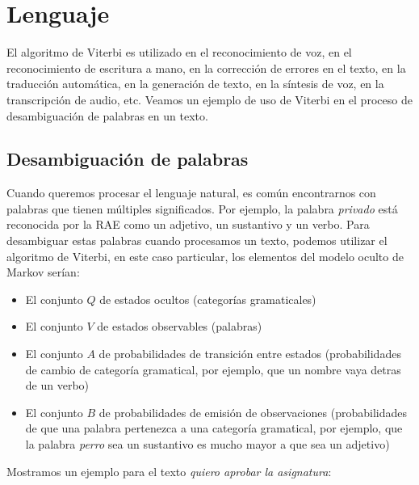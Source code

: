 \documentclass[11pt,openany]{book}
\begin{document}
\section{Lenguaje}
El algoritmo de Viterbi es utilizado en el reconocimiento de voz, en el reconocimiento
de escritura a mano, en la corrección de errores en el texto, en la traducción automática,
en la generación de texto, en la síntesis de voz, en la transcripción de audio, etc. Veamos
un ejemplo de uso de Viterbi en el proceso de desambiguación de palabras en un texto.
\subsection{Desambiguación de palabras}
Cuando queremos procesar el lenguaje natural, es común encontrarnos con palabras que tienen
múltiples significados. Por ejemplo, la palabra \textit{privado} está reconocida por la RAE como 
un adjetivo, un sustantivo y un verbo. Para desambiguar estas palabras cuando procesamos
un texto, podemos utilizar el algoritmo de Viterbi, en este caso particular, 
los elementos del modelo oculto de Markov serían:
\begin{itemize}
      \boldmath
      \item El conjunto $Q$ de estados ocultos (categorías gramaticales)
      \item El conjunto $V$ de estados observables (palabras)
      \item El conjunto $A$ de probabilidades de transición entre estados (probabilidades de cambio de categoría gramatical, por ejemplo, que un nombre vaya detras de un verbo)
      \item El conjunto $B$ de probabilidades de emisión de observaciones (probabilidades de que una palabra pertenezca a una categoría gramatical, por ejemplo, 
      que la palabra \textit{perro} sea un sustantivo es mucho mayor a que sea un adjetivo)
\end{itemize}
Mostramos un ejemplo para el texto \textit{quiero aprobar la asignatura}:
\end{document}
